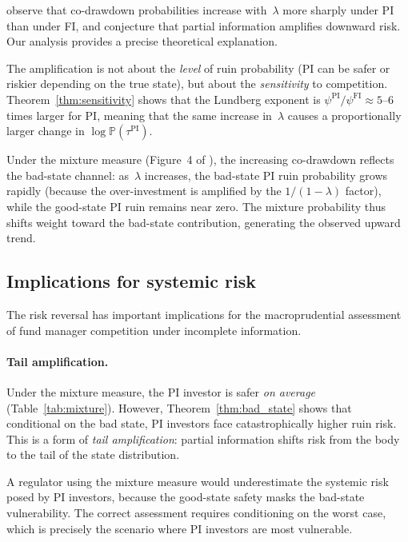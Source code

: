 \documentclass[12pt]{article}
\theoremstyle{remark}
\theoremstyle{definition}
\newcommand{\Prob}{\mathbb{P}}
\newcommand{\FI}{\mathrm{FI}}
\newcommand{\PI}{\mathrm{PI}}
\begin{document}
\citet[Figure~4]{HuangSun2025} observe that co-drawdown probabilities
increase with~$\lambda$ more sharply under PI than under FI, and
conjecture that partial information amplifies downward risk.
Our analysis provides a precise theoretical explanation.

The amplification is not about the \emph{level} of ruin probability
(PI can be safer or riskier depending on the true state), but about
the \emph{sensitivity} to competition.
Theorem~\ref{thm:sensitivity} shows that the Lundberg exponent is
$\psi^{\PI}/\psi^{\FI} \approx 5$--$6$ times larger for PI, meaning
that the same increase in~$\lambda$ causes a proportionally larger
change in $\log\Prob(\tau^{\PI})$.

Under the mixture measure (Figure~4 of \citealt{HuangSun2025}),
the increasing co-drawdown reflects the bad-state channel:
as~$\lambda$ increases, the bad-state PI ruin probability grows
rapidly (because the over-investment is amplified by the
$1/(1-\lambda)$ factor), while the good-state PI ruin remains
near zero.
The mixture probability thus shifts weight toward the bad-state
contribution, generating the observed upward trend.


\subsection{Implications for systemic risk}\label{sec:discuss_systemic}

The risk reversal has important implications for the macroprudential
assessment of fund manager competition under incomplete information.

\paragraph{Tail amplification.}
Under the mixture measure, the PI investor is safer \emph{on average}
(Table~\ref{tab:mixture}).
However, Theorem~\ref{thm:bad_state} shows that conditional on the
bad state, PI investors face catastrophically higher ruin risk.
This is a form of \emph{tail amplification}: partial information
shifts risk from the body to the tail of the state distribution.

A regulator using the mixture measure would underestimate the
systemic risk posed by PI investors, because the good-state safety
masks the bad-state vulnerability.
The correct assessment requires conditioning on the worst case,
which is precisely the scenario where PI investors are most
vulnerable.
\end{document}

